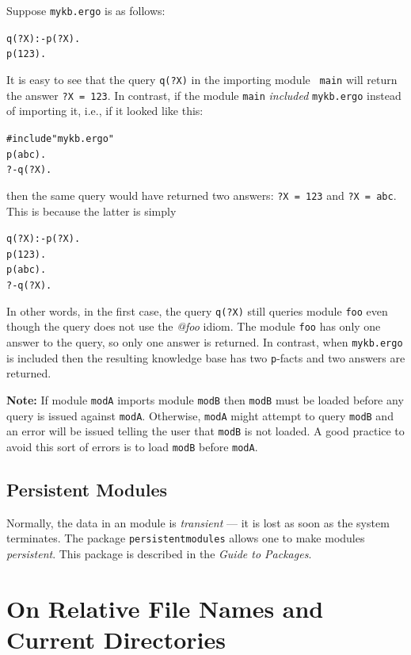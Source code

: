 \documentclass[11pt]{article}
\newcommand{\ERGO}{\mbox{\smaller{\ensuremath{\cal{E}}\smaller{{\sc{RGO}}}}}\xspace}
\newcommand{\FLSYSTEM}{\ERGO}
\newcommand{\ergoext}{ergo\xspace}
\begin{document}
Suppose {\tt mykb.\ergoext} is as follows:
\begin{alltt}
  q(?X) :- p(?X).
  p(123).
\end{alltt}
It is easy to see that the query {\tt q(?X)} in the importing module {\tt
  main} will return the answer {\tt ?X = 123}. In contrast, if the module
{\tt main} \emph{included} {\tt mykb.\ergoext} instead of importing it, i.e.,
if it looked like this:
\begin{alltt}
  #include "mykb.\ergoext"
  p(abc).
  ?- q(?X).
\end{alltt}
then the same query would have returned two answers: {\tt ?X = 123} and 
{\tt ?X = abc}. This is because the latter is simply
\begin{alltt}
  q(?X) :- p(?X).
  p(123).
  p(abc).
  ?- q(?X).
\end{alltt}
In other words, in the first case, the query {\tt q(?X)} still queries
module {\tt foo} even though the query does not use the \emph{@foo}    
idiom. The module {\tt foo} has only one answer to the query, so only one
answer is returned. In contrast, when {\tt mykb.\ergoext} is included then
the resulting knowledge base has two {\tt p}-facts and two answers are returned. 

\textbf{Note:} If module \texttt{modA} imports module \texttt{modB}
then \texttt{modB} must be loaded before
any query is issued against \texttt{modA}. Otherwise, \texttt{modA} might
attempt to query \texttt{modB} and an error will be issued telling the user
that \texttt{modB} is not loaded. A good practice to avoid this sort of
errors is to load \texttt{modB} before \texttt{modA}.

\subsection{Persistent Modules}\label{sec-persist-storage}

Normally, the data
in an \FLSYSTEM module is
{\em transient} --- it is lost as soon as the system terminates.
The \FLSYSTEM package {\tt persistentmodules}  allows one to make
\FLSYSTEM modules \emph{persistent}. This package is described in
the \emph{Guide to \FLSYSTEM Packages}.





\section{On Relative File Names and Current Directories}
\end{document}

